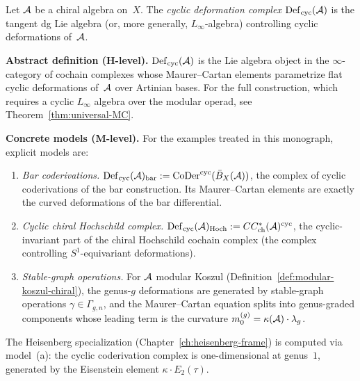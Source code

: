\begin{definition}
\label{def:cyclic-deformation-elementary}
Let $\mathcal{A}$ be a chiral algebra on~$X$.  The \emph{cyclic deformation
complex} $\operatorname{Def}_{\mathrm{cyc}}(\mathcal{A})$ is the tangent dg
Lie algebra (or, more generally, $L_\infty$-algebra) controlling
cyclic deformations of~$\mathcal{A}$.

\smallskip\noindent
\textbf{Abstract definition (H-level).}
$\operatorname{Def}_{\mathrm{cyc}}(\mathcal{A})$ is the Lie algebra object in
the $\infty$-category of cochain complexes whose Maurer--Cartan
elements parametrize flat cyclic deformations of~$\mathcal{A}$ over
Artinian bases.  For the full construction, which requires a cyclic
$L_\infty$ algebra over the modular operad, see
Theorem~\ref{thm:universal-MC}.

\smallskip\noindent
\textbf{Concrete models (M-level).}
For the examples treated in this monograph, explicit models are:

\begin{enumerate}[label=\textup{(\alph*)}]
\item \emph{Bar coderivations.}
  $\operatorname{Def}_{\mathrm{cyc}}(\mathcal{A})_{\mathrm{bar}}
  := \operatorname{CoDer}^{\mathrm{cyc}}(\bar{B}_X(\mathcal{A}))$,
  the complex of cyclic coderivations of the bar construction.
  Its Maurer--Cartan elements are exactly the curved deformations
  of the bar differential.
\item \emph{Cyclic chiral Hochschild complex.}
  $\operatorname{Def}_{\mathrm{cyc}}(\mathcal{A})_{\mathrm{Hoch}}
  := CC^*_{\mathrm{ch}}(\mathcal{A})^{\mathrm{cyc}}$,
  the cyclic-invariant part of the chiral Hochschild cochain complex
  (the complex controlling $S^1$-equivariant deformations).
\item \emph{Stable-graph operations.}
  For $\mathcal{A}$ modular Koszul
  (Definition~\ref{def:modular-koszul-chiral}), the genus-$g$
  deformations are generated by stable-graph operations
  $\gamma \in \Gamma_{g,n}$, and the Maurer--Cartan equation
  splits into genus-graded components whose leading term is the
  curvature $m_0^{(g)} = \kappa(\mathcal{A}) \cdot \lambda_g$.
\end{enumerate}

The Heisenberg specialization (Chapter~\ref{ch:heisenberg-frame})
is computed via model~(a): the cyclic coderivation complex is
one-dimensional at genus~$1$, generated by the Eisenstein element
$\kappa \cdot E_2(\tau)$.
\end{definition}

